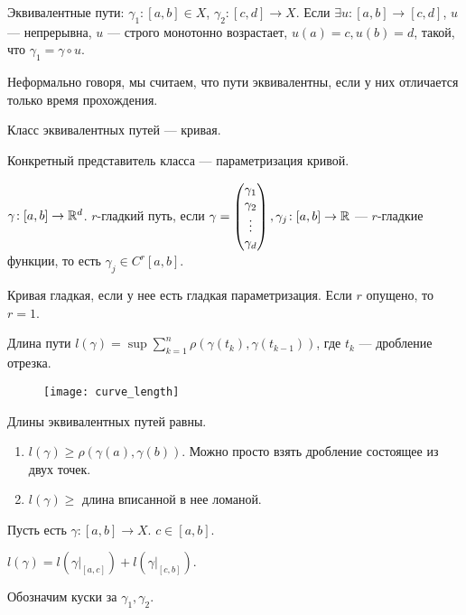 \begin{definition}
    Эквивалентные пути: $\gamma_1\!:[a, b] \in X$, $\gamma_2\!: [c,d] \to X$. Если  $\exists u\!:[a, b] \to [c, d]$,  $u$ --- непрерывна,  $u$ --- строго монотонно возрастает,  $u(a) = c, u(b) = d$, такой, что  $\gamma_1 = \gamma \circ u$.

    Неформально говоря, мы считаем, что пути эквивалентны, если у них отличается только время прохождения.
\end{definition}
\begin{definition}
    Класс эквивалентных путей --- кривая.

    Конкретный представитель класса --- параметризация кривой.
\end{definition}
\begin{definition}
    $\gamma\!: [a,b] \to \mathbb{R}^d$.  $r$-гладкий путь, если  $\gamma = \begin{pmatrix} \gamma_1 \\ \gamma_2 \\ \vdots \\ \gamma_d \end{pmatrix}, \gamma_j\!:[a,b] \to \mathbb{R}$ --- $r$-гладкие функции, то есть  $\gamma_j \in C^r[a,b]$.

    Кривая гладкая, если у нее есть гладкая параметризация. Если  $r$ опущено, то  $r=1$.
\end{definition}
\begin{definition}
    Длина пути $l(\gamma) = \sup \sum\limits_{k=1}^n \rho(\gamma(t_k), \gamma(t_{k-1}))$, где  $t_k$ --- дробление отрезка.
    \begin{figure}[h!]
        \texttt{[image: curve\_length]}
    \end{figure}
\end{definition}
\begin{remark}
    Длины эквивалентных путей равны.
\end{remark}
\begin{properties}
    \begin{enumerate}
        \item $l(\gamma) \ge \rho(\gamma(a), \gamma(b))$. Можно просто взять дробление состоящее из двух точек.
        \item $l(\gamma) \ge$ длина вписанной в нее ломаной.
    \end{enumerate}
\end{properties}
\begin{theorem}
    Пусть есть $\gamma\!: [a, b] \to X$.  $c \in [a, b]$. 

    $l(\gamma) = l(\gamma \Big|_{[a, c]}) + l(\gamma \Big|_{[c, b]})$.

    Обозначим куски за  $\gamma_1, \gamma_2$.
\end{theorem}
